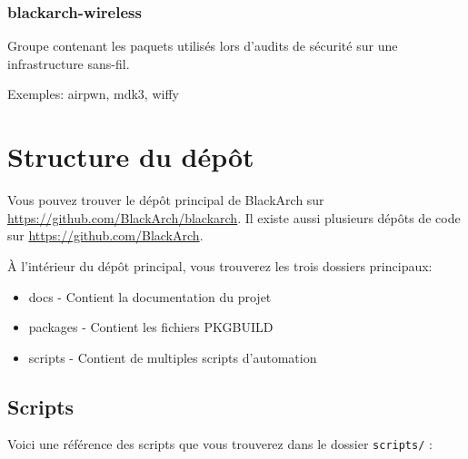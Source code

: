 \documentclass[a4paper, oneside, 11pt]{book}
\begin{document}
\subsubsection{blackarch-wireless}

Groupe contenant les paquets utilisés lors d'audits de sécurité sur une
infrastructure sans-fil.

Exemples: airpwn, mdk3, wiffy

\section{Structure du dépôt}

Vous pouvez trouver le dépôt principal de BlackArch sur
\href{https://github.com/BlackArch/blackarch}
{https://github.com/BlackArch/blackarch}. Il existe aussi plusieurs dépôts de
code sur \href{https://github.com/BlackArch}{https://github.com/BlackArch}.

À l'intérieur du dépôt principal, vous trouverez les trois dossiers principaux:

\begin{itemize}
\item docs - Contient la documentation du projet
\item packages - Contient les fichiers PKGBUILD
\item scripts - Contient de multiples scripts d'automation
\end{itemize}

\subsection{Scripts}

Voici une référence des scripts que vous trouverez dans le dossier
\verb|scripts/| :
\end{document}
